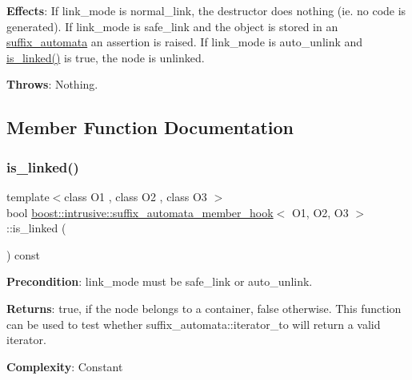 {\bfseries Effects}\+: If link\+\_\+mode is {\ttfamily normal\+\_\+link}, the destructor does nothing (ie. no code is generated). If link\+\_\+mode is {\ttfamily safe\+\_\+link} and the object is stored in an \hyperlink{classboost_1_1intrusive_1_1suffix__automata}{suffix\+\_\+automata} an assertion is raised. If link\+\_\+mode is {\ttfamily auto\+\_\+unlink} and {\ttfamily \hyperlink{classboost_1_1intrusive_1_1suffix__automata__member__hook_a785349f14feccd5bc2b775814914a262}{is\+\_\+linked()}} is true, the node is unlinked.

{\bfseries Throws}\+: Nothing. 

\subsection{Member Function Documentation}
\mbox{\label{classboost_1_1intrusive_1_1suffix__automata__member__hook_a785349f14feccd5bc2b775814914a262}} 
\subsubsection{\texorpdfstring{is\+\_\+linked()}{is\_linked()}}
{\footnotesize\ttfamily template$<$class O1 , class O2 , class O3 $>$ \\
bool \hyperlink{classboost_1_1intrusive_1_1suffix__automata__member__hook}{boost\+::intrusive\+::suffix\+\_\+automata\+\_\+member\+\_\+hook}$<$ O1, O2, O3 $>$\+::is\+\_\+linked (\begin{DoxyParamCaption}{ }\end{DoxyParamCaption}) const}

{\bfseries Precondition}\+: link\+\_\+mode must be {\ttfamily safe\+\_\+link} or {\ttfamily auto\+\_\+unlink}.

{\bfseries Returns}\+: true, if the node belongs to a container, false otherwise. This function can be used to test whether {\ttfamily suffix\+\_\+automata\+::iterator\+\_\+to} will return a valid iterator.

{\bfseries Complexity}\+: Constant \mbox{\label{classboost_1_1intrusive_1_1suffix__automata__member__hook_a744f716be03e65c94b913d46f96e59e1}} 
